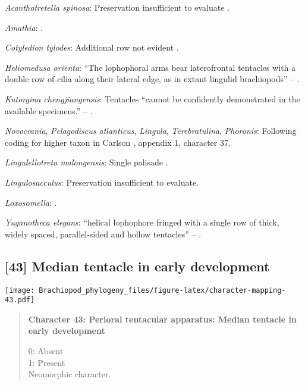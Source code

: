 \documentclass[openany]{book}
\theoremstyle{definition}
\theoremstyle{definition}
\theoremstyle{definition}
\theoremstyle{remark}
\begin{document}
\hypertarget{Acanthotretella_spinosa-coding-42}{}
\emph{Acanthotretella spinosa}: Preservation insufficient to evaluate
\citep{Holmer2006Aspinose}.

\hypertarget{Amathia-coding-42}{}
\emph{Amathia}: \citep{Temereva2016Thenervous}.

\hypertarget{Cotyledion_tylodes-coding-42}{}
\emph{Cotyledion tylodes}: Additional row not evident \citep{Zhang2013}.

\hypertarget{Heliomedusa_orienta-coding-42}{}
\emph{Heliomedusa orienta}: ``The lophophoral arms bear laterofrontal
tentacles with a double row of cilia along their lateral edge, as in
extant lingulid brachiopods'' -- \citet{Zhang2009Architectureand}.

\hypertarget{Kutorgina_chengjiangensis-coding-42}{}
\emph{Kutorgina chengjiangensis}: Tentacles ``cannot be confidently
demonstrated in the available specimens.'' --
\citet{Zhang2007Rhynchonelliformeanbrachiopods}.

\hypertarget{Lingula-coding-42}{}
\emph{Novocrania}, \emph{Pelagodiscus atlanticus}, \emph{Lingula},
\emph{Terebratulina}, \emph{Phoronis}: Following coding for higher taxon
in Carlson \citeyearpar{Carlson1995Phylogeneticrelationships}, appendix
1, character 37.

\hypertarget{Lingulellotreta_malongensis-coding-42}{}
\emph{Lingulellotreta malongensis}: Single palisade
\citep{Zhang2004Newdata}.

\hypertarget{Lingulosacculus-coding-42}{}
\emph{Lingulosacculus}: Preservation insufficient to evaluate.

\hypertarget{Loxosomella-coding-42}{}
\emph{Loxosomella}: \citet{Nielsen1966}.

\hypertarget{Yuganotheca_elegans-coding-42}{}
\emph{Yuganotheca elegans}: ``helical lophophore fringed with a single
row of thick, widely spaced, parallel-sided and hollow tentacles'' --
\citet{Zhang2014Anearly}.

\subsection*{{[}43{]} Median tentacle in early
development}\label{median-tentacle-in-early-development}

\texttt{[image: Brachiopod\_phylogeny\_files/figure-latex/character-mapping-43.pdf]}

\begin{quote}
\textbf{Character 43: Perioral tentacular apparatus: Median tentacle in
early development}

0: Absent\\
1: Present\\
Neomorphic character.
\end{quote}
\end{document}
